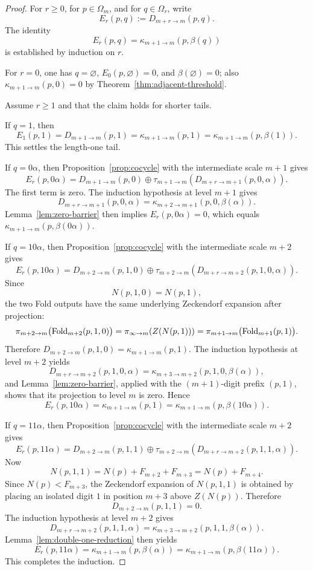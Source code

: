 \begin{proof}
For $r\ge 0$, for $p\in\Omega_m$, and for $q\in\Omega_r$, write
\[
E_r(p,q):=D_{m+r\to m}(p,q).
\]
The identity
\[
E_r(p,q)=\kappa_{m+1\to m}(p,\beta(q))
\]
is established by induction on $r$.

For $r=0$, one has $q=\varnothing$, $E_0(p,\varnothing)=0$, and
$\beta(\varnothing)=0$; also
$\kappa_{m+1\to m}(p,0)=0$ by
Theorem~\ref{thm:adjacent-threshold}.

Assume $r\ge 1$ and that the claim holds for shorter tails.

If $q=1$, then
\[
E_1(p,1)=D_{m+1\to m}(p,1)=\kappa_{m+1\to m}(p,1)
=
\kappa_{m+1\to m}(p,\beta(1)).
\]
This settles the length-one tail.

If $q=0\alpha$, then Proposition~\ref{prop:cocycle} with the intermediate scale
$m+1$ gives
\[
E_r(p,0\alpha)
=
D_{m+1\to m}(p,0)
\oplus
\tau_{m+1\to m}(D_{m+r\to m+1}(p,0,\alpha)).
\]
The first term is zero.  The induction hypothesis at level $m+1$ gives
\[
D_{m+r\to m+1}(p,0,\alpha)
=
\kappa_{m+2\to m+1}(p,0,\beta(\alpha)).
\]
Lemma~\ref{lem:zero-barrier} then implies $E_r(p,0\alpha)=0$, which equals
$\kappa_{m+1\to m}(p,\beta(0\alpha))$.

If $q=10\alpha$, then Proposition~\ref{prop:cocycle} with the intermediate
scale $m+2$ gives
\[
E_r(p,10\alpha)
=
D_{m+2\to m}(p,1,0)
\oplus
\tau_{m+2\to m}(D_{m+r\to m+2}(p,1,0,\alpha)).
\]
Since
\[
N(p,1,0)=N(p,1),
\]
the two Fold outputs have the same underlying Zeckendorf expansion after
projection:
\[
\pi_{m+2\to m}\bigl(\operatorname{Fold}_{m+2}(p,1,0)\bigr)
=
\pi_{\infty\to m}(Z(N(p,1)))
=
\pi_{m+1\to m}\bigl(\operatorname{Fold}_{m+1}(p,1)\bigr).
\]
Therefore $D_{m+2\to m}(p,1,0)=\kappa_{m+1\to m}(p,1)$.  The induction
hypothesis at level $m+2$ yields
\[
D_{m+r\to m+2}(p,1,0,\alpha)
=
\kappa_{m+3\to m+2}(p,1,0,\beta(\alpha)),
\]
and Lemma~\ref{lem:zero-barrier}, applied with the $(m+1)$-digit prefix
$(p,1)$, shows that its projection to level $m$ is zero.  Hence
\[
E_r(p,10\alpha)=\kappa_{m+1\to m}(p,1)
=
\kappa_{m+1\to m}(p,\beta(10\alpha)).
\]

If $q=11\alpha$, then Proposition~\ref{prop:cocycle} with the intermediate
scale $m+2$ gives
\[
E_r(p,11\alpha)
=
D_{m+2\to m}(p,1,1)
\oplus
\tau_{m+2\to m}(D_{m+r\to m+2}(p,1,1,\alpha)).
\]
Now
\[
N(p,1,1)=N(p)+F_{m+2}+F_{m+3}=N(p)+F_{m+4}.
\]
Since $N(p)<F_{m+3}$, the Zeckendorf expansion of $N(p,1,1)$ is obtained by
placing an isolated digit $1$ in position $m+3$ above $Z(N(p))$.  Therefore
\[
D_{m+2\to m}(p,1,1)=0.
\]
The induction hypothesis at level $m+2$ gives
\[
D_{m+r\to m+2}(p,1,1,\alpha)
=
\kappa_{m+3\to m+2}(p,1,1,\beta(\alpha)).
\]
Lemma~\ref{lem:double-one-reduction} then yields
\[
E_r(p,11\alpha)
=
\kappa_{m+1\to m}(p,\beta(\alpha))
=
\kappa_{m+1\to m}(p,\beta(11\alpha)).
\]
This completes the induction.


\end{proof}
